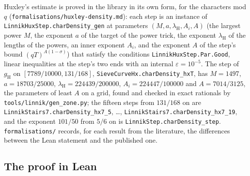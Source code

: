 \documentclass[11pt]{article}
\newcommand{\lean}[1]{\texttt{#1}}
\newcommand{\file}[1]{\nolinkurl{#1}}
\numberwithin{equation}{section}
\begin{document}
Huxley's estimate is proved in the library in its own form, for the characters mod $q$
(\file{formalisations/huxley-density.md}): each step is an instance of \lean{LinnikHuxStep.charDensity\_gen} at
parameters $(M, a, \lambda_{\mathrm H}, A_i, A)$ (the largest power $M$, the exponent $a$ of the target of the power
trick, the exponent $\lambda_{\mathrm H}$ of the lengths of the powers, an inner exponent $A_i$, and the exponent $A$ of
the step's bound $(qT)^{A(1 - \sigma)}$) that satisfy the conditions \lean{LinnikHuxStep.Par.Good}, linear inequalities
at
the step's two ends with an internal $\varepsilon = 10^{-5}$. The step of $g_{\mathrm H}$ on $[7789/10000, 131/168]$,
\lean{SieveCurveHx.charDensity\_hxT}, has $M = 1497$, $a = 18703/25000$, $\lambda_{\mathrm H} = 224439/200000$, $A_i =
224447/100000$ and $A = 7014/3125$, the parameters of least $A$ on a grid, found and checked in exact rationals by
\file{tools/linnik/gen\_zone.py}; the fifteen steps from $131/168$ on are \lean{LinnikStairs7.charDensity\_hx7\_5},
\dots, \lean{LinnikStairs7.charDensity\_hx7\_19}, and the exponent $101/50$ from $5/6$ on is
\lean{LinnikStep.charDensity\_step}. \file{formalisations/} records, for each result from the literature, the
differences between the Lean statement and the published one.

\subsection*{The proof in Lean}
\end{document}
